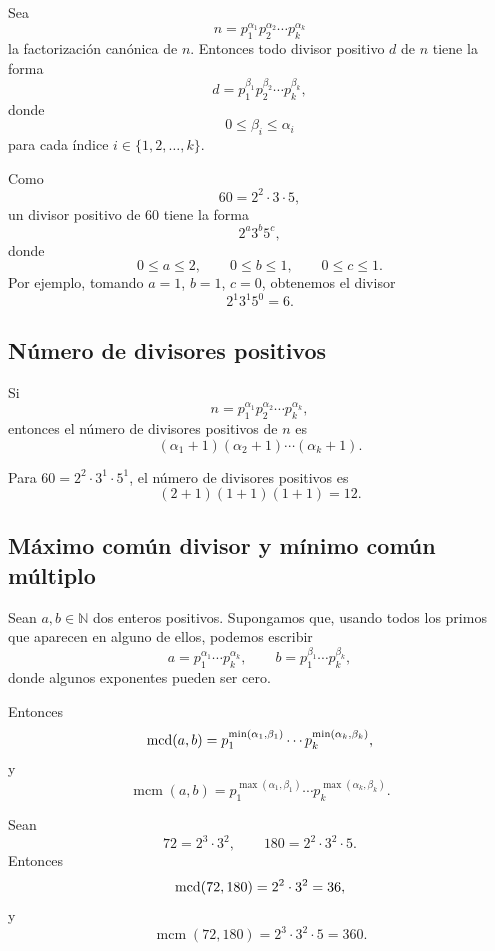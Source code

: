Sea
\[
  n=p_1^{\alpha_1}p_2^{\alpha_2}\cdots p_k^{\alpha_k}
\]
la factorización canónica de \(n\). Entonces todo divisor positivo \(d\) de \(n\) tiene la forma
\[
  d=p_1^{\beta_1}p_2^{\beta_2}\cdots p_k^{\beta_k},
\]
donde
\[
  0\leq \beta_i\leq \alpha_i
\]
para cada índice \(i\in\{1,2,\ldots,k\}\).

\begin{ejemplo}
Como
\[
  60=2^2\cdot 3\cdot 5,
\]
un divisor positivo de \(60\) tiene la forma
\[
  2^a3^b5^c,
\]
donde
\[
  0\leq a\leq 2, \qquad 0\leq b\leq 1, \qquad 0\leq c\leq 1.
\]
Por ejemplo, tomando \(a=1\), \(b=1\), \(c=0\), obtenemos el divisor
\[
  2^1 3^1 5^0=6.
\]
\end{ejemplo}

\subsection*{Número de divisores positivos}

Si
\[
  n=p_1^{\alpha_1}p_2^{\alpha_2}\cdots p_k^{\alpha_k},
\]
entonces el número de divisores positivos de \(n\) es
\[
  (\alpha_1+1)(\alpha_2+1)\cdots(\alpha_k+1).
\]

\begin{ejemplo}
Para \(60=2^2\cdot 3^1\cdot 5^1\), el número de divisores positivos es
\[
  (2+1)(1+1)(1+1)=12.
\]
\end{ejemplo}

\subsection*{Máximo común divisor y mínimo común múltiplo}

Sean \(a,b\in\mathbb{N}\) dos enteros positivos. Supongamos que, usando todos los primos que aparecen en alguno de ellos, podemos escribir
\[
  a=p_1^{\alpha_1}\cdots p_k^{\alpha_k},
  \qquad
  b=p_1^{\beta_1}\cdots p_k^{\beta_k},
\]
donde algunos exponentes pueden ser cero.

Entonces
\[
  \operatorname{mcd}(a,b)=p_1^{\min(\alpha_1,\beta_1)}\cdots p_k^{\min(\alpha_k,\beta_k)},
\]
y
\[
  \operatorname{mcm}(a,b)=p_1^{\max(\alpha_1,\beta_1)}\cdots p_k^{\max(\alpha_k,\beta_k)}.
\]

\begin{ejemplo}
Sean
\[
  72=2^3\cdot 3^2,
  \qquad
  180=2^2\cdot 3^2\cdot 5.
\]
Entonces
\[
  \operatorname{mcd}(72,180)=2^2\cdot 3^2=36,
\]
y
\[
  \operatorname{mcm}(72,180)=2^3\cdot 3^2\cdot 5=360.
\]
\end{ejemplo}

